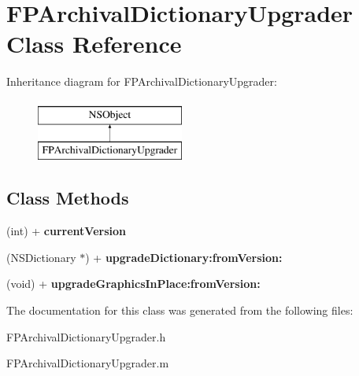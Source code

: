 \hypertarget{interface_f_p_archival_dictionary_upgrader}{}\section{F\+P\+Archival\+Dictionary\+Upgrader Class Reference}
\label{interface_f_p_archival_dictionary_upgrader}
Inheritance diagram for F\+P\+Archival\+Dictionary\+Upgrader\+:\begin{figure}[H]
\begin{center}
\leavevmode
\includegraphics[height=2.000000cm]{interface_f_p_archival_dictionary_upgrader}
\end{center}
\end{figure}
\subsection*{Class Methods}
\begin{DoxyCompactItemize}
\item 
\mbox{\label{interface_f_p_archival_dictionary_upgrader_a1b3ab3a53a85cbf55a783a56e2e784af}} 
(int) + {\bfseries current\+Version}
\item 
\mbox{\label{interface_f_p_archival_dictionary_upgrader_a44ddf8b2c02713d0426bcf38a4f8a3a5}} 
(N\+S\+Dictionary $\ast$) + {\bfseries upgrade\+Dictionary\+:from\+Version\+:}
\item 
\mbox{\label{interface_f_p_archival_dictionary_upgrader_ae5dc3add80bd9b37585e169885c06193}} 
(void) + {\bfseries upgrade\+Graphics\+In\+Place\+:from\+Version\+:}
\end{DoxyCompactItemize}


The documentation for this class was generated from the following files\+:\begin{DoxyCompactItemize}
\item 
F\+P\+Archival\+Dictionary\+Upgrader.\+h\item 
F\+P\+Archival\+Dictionary\+Upgrader.\+m\end{DoxyCompactItemize}
